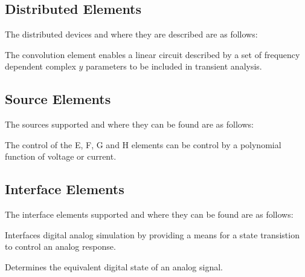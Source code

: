 {

}

\subsection{Distributed Elements}

The distributed devices
and where they are described are as follows:

The convolution element enables a linear circuit described by a set of
frequency dependent complex $y$ parameters to be included in transient
analysis.


\subsection{Source Elements}

The sources supported and where they can be found are as follows:


The control of the E, F, G and H elements can be control by a polynomial
function of voltage or current.

\subsection{Interface Elements}

The interface elements supported and where they can be found
are as follows:

Interfaces digital analog simulation by providing a means for a state
transistion to control an analog response.

Determines the equivalent digital state of an analog signal.

